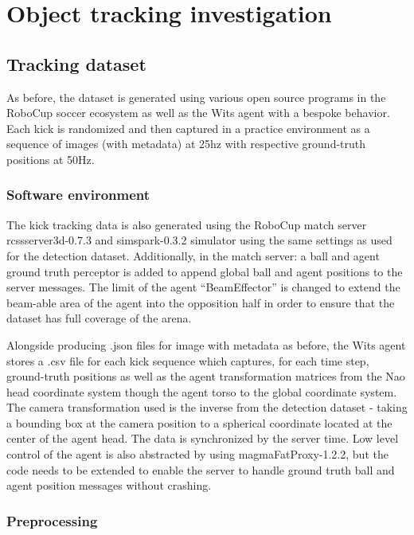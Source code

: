 \documentclass[a4paper,twoside,12pt]{report}
\begin{document}
\chapter{Object tracking investigation}

\section{Tracking dataset}
As before, the dataset is generated using various open source programs in the RoboCup soccer ecosystem as well as the Wits agent with a bespoke behavior. Each kick is randomized and then captured in a practice environment as a sequence of images (with metadata) at 25hz with respective ground-truth positions at 50Hz.

\subsection{Software environment}
The kick tracking data is also generated using the RoboCup match server rcssserver3d-0.7.3 and simspark-0.3.2 simulator using the same settings as used for the detection dataset. Additionally, in the match server: a ball and agent ground truth perceptor is added to append global ball and agent positions to the server messages. The limit of the agent ``BeamEffector'' is changed to extend the beam-able area of the agent into the opposition half in order to ensure that the dataset has full coverage of the arena.

Alongside producing .json files for image with metadata as before, the Wits agent stores a .csv file for each kick sequence which captures, for each time step, ground-truth positions as well as the agent transformation matrices from the Nao head coordinate system though the agent torso to the global coordinate system. The camera transformation used is the inverse from the detection dataset - taking a bounding box at the camera position to a spherical coordinate located at the center of the agent head. The data is synchronized by the server time. Low level control of the agent is also abstracted by using magmaFatProxy-1.2.2, but the code needs to be extended to enable the server to handle ground truth ball and agent position messages without crashing. 

\subsection{Preprocessing}
\end{document}

